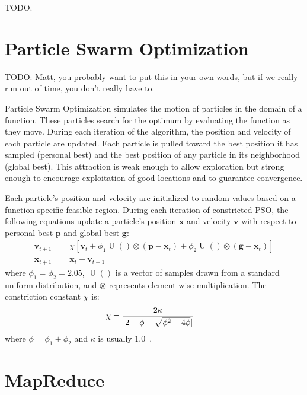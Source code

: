 \documentclass[letterpaper]{sig-alternate}
\renewcommand{\Vec}[1]{\mathbf{#1}}
\DeclareMathOperator{\URand}{U}
\providecommand{\ppos}{\ensuremath{\Vec{x}}}
\providecommand{\pvel}{\ensuremath{\Vec{v}}}
\providecommand{\gbest}{\ensuremath{\Vec{g}}}
\providecommand{\pbest}{\ensuremath{\Vec{p}}}
\providecommand{\constriction}{\ensuremath{\chi}}
\providecommand{\coeff}{\ensuremath{\phi}}
\begin{document}
TODO.


\section{Particle Swarm Optimization}
\label{sec:pso}

TODO: Matt, you probably want to put this in your own words, but if we
really run out of time, you don't really have to.

Particle Swarm Optimization simulates the motion of particles in the domain of
a function.  These particles search for the optimum by evaluating the function
as they move.  During each iteration of the algorithm, the position and
velocity of each particle are updated.  Each particle is pulled toward the
best position it has sampled (personal best) and the best position of any
particle in its neighborhood (global best).  This attraction is weak enough to
allow exploration but strong enough to encourage exploitation of good
locations and to guarantee convergence.

Each particle's position and velocity are initialized to random values based
on a function-specific feasible region.  During each iteration of constricted
PSO, the following equations update a particle's position $\ppos$ and velocity
$\pvel$ with respect to personal best $\pbest$ and global best $\gbest$:
\begin{align}
\label{eq:velupdate}
    \pvel_{t+1} &=
        \constriction \left[ \pvel_t + 
            \coeff_1\URand()\otimes(\pbest - \ppos_{t}) +
            \coeff_2\URand()\otimes(\gbest - \ppos_{t})
        \right] \\
\label{eq:posupdate}
    \ppos_{t+1} &= \ppos_t + \pvel_{t+1}
\end{align}
where $\coeff_1 = \coeff_2 = 2.05$, $\URand()$ is a vector of samples
drawn from a standard uniform distribution, and $\otimes$ represents
element-wise multiplication.  The constriction constant $\constriction$
is:
\begin{align}
    \notag
    \constriction &= \frac{2 \kappa}{|2 - \coeff - \sqrt{\coeff^2 - 4\coeff}|}
\end{align}
where
$\coeff = \coeff_1 + \coeff_2$ and $\kappa$ is usually
$1.0$~\cite{clerc-tec02}.





\section{MapReduce}
\label{sec:mapreduce}
\end{document}
